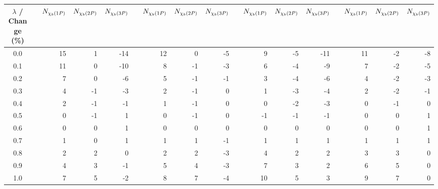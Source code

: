 \begin{table}[H]
{{\begin{tabular}{crrrrrrrrrrrrrrrr}
\cmidrule{3-5}\cmidrule{7-9}\cmidrule{11-13}\cmidrule{15-17}
$\lambda$ / Change (\%)  & & $N_{\chi_{b}(1P)}$ & $N_{\chi_{b}(2P)}$ & $N_{\chi_{b}(3P)}$ & & $N_{\chi_{b}(1P)}$ & $N_{\chi_{b}(2P)}$ & $N_{\chi_{b}(3P)}$ & & $N_{\chi_{b}(1P)}$ & $N_{\chi_{b}(2P)}$ & $N_{\chi_{b}(3P)}$ & & $N_{\chi_{b}(1P)}$ & $N_{\chi_{b}(2P)}$ & $N_{\chi_{b}(3P)}$ \\
\midrule
0.0  &  & 15 & 1 & -14 &  & 12 & 0 & -5 &  & 9 & -5 & -11 &  & 11 & -2 & -8\\
0.1  &  & 11 & 0 & -10 &  & 8 & -1 & -3 &  & 6 & -4 & -9 &  & 7 & -2 & -5\\
0.2  &  & 7 & 0 & -6 &  & 5 & -1 & -1 &  & 3 & -4 & -6 &  & 4 & -2 & -3\\
0.3  &  & 4 & -1 & -3 &  & 2 & -1 & 0 &  & 1 & -3 & -4 &  & 2 & -2 & -1\\
0.4  &  & 2 & -1 & -1 &  & 1 & -1 & 0 &  & 0 & -2 & -3 &  & 0 & -1 & 0\\
0.5  &  & 0 & -1 & 1 &  & 0 & -1 & 0 &  & -1 & -1 & -1 &  & 0 & 0 & 1\\
0.6  &  & 0 & 0 & 1 &  & 0 & 0 & 0 &  & 0 & 0 & 0 &  & 0 & 0 & 1\\
0.7  &  & 1 & 0 & 1 &  & 1 & 1 & -1 &  & 1 & 1 & 1 &  & 1 & 1 & 1\\
0.8  &  & 2 & 2 & 0 &  & 2 & 2 & -3 &  & 4 & 2 & 2 &  & 3 & 3 & 0\\
0.9  &  & 4 & 3 & -1 &  & 5 & 4 & -3 &  & 7 & 3 & 2 &  & 6 & 5 & 0\\
1.0  &  & 7 & 5 & -2 &  & 8 & 7 & -4 &  & 10 & 5 & 3 &  & 9 & 7 & 0\\
\bottomrule
\end{tabular}
}
}
\label{tab:syst:lambda1s}
\end{table}
